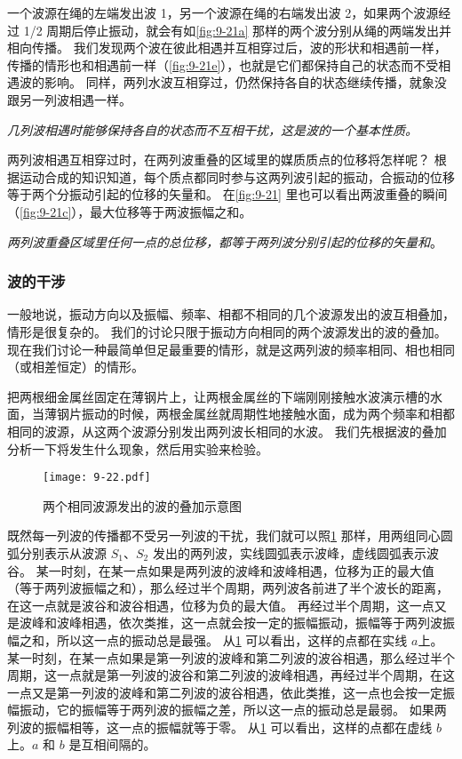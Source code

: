 一个波源在绳的左端发出波 1，另一个波源在绳的右端发出波 2，如果两个波源经过 1/2 周期后停止振动，就会有如\cref{fig:9-21a} 那样的两个波分别从绳的两端发出并相向传播。
我们发现两个波在彼此相遇并互相穿过后，波的形状和相遇前一样，传播的情形也和相遇前一样（\cref{fig:9-21e}），也就是它们都保持自己的状态而不受相遇波的影响。
同样，两列水波互相穿过，仍然保持各自的状态继续传播，就象没跟另一列波相遇一样。

\emph{几列波相遇时能够保持各自的状态而不互相干扰，这是波的一个基本性质。}

两列波相遇互相穿过时，在两列波重叠的区域里的媒质质点的位移将怎样呢？
根据运动合成的知识知道，每个质点都同时参与这两列波引起的振动，合振动的位移等于两个分振动引起的位移的矢量和。
在\cref{fig:9-21} 里也可以看出两波重叠的瞬间（\cref{fig:9-21c}），最大位移等于两波振幅之和。

\emph{两列波重叠区域里任何一点的总位移，都等于两列波分别引起的位移的矢量和}。

\subsubsection{波的干涉} 
一般地说，振动方向以及振幅、频率、相都不相同的几个波源发出的波互相叠加，情形是很复杂的。
我们的讨论只限于振动方向相同的两个波源发出的波的叠加。
现在我们讨论一种最简单但足最重要的情形，就是这两列波的频率相同、相也相同（或相差恒定）的情形。

把两根细金属丝固定在薄钢片上，让两根金属丝的下端刚刚接触水波演示槽的水面，当薄钢片振动的时候，两根金属丝就周期性地接触水面，成为两个频率和相都相同的波源，从这两个波源分别发出两列波长相同的水波。
我们先根据波的叠加分析一下将发生什么现象，然后用实验来检验。
\begin{figure}
  \texttt{[image: 9-22.pdf]}
  \caption{两个相同波源发出的波的叠加示意图}\label{fig:9-22}
\end{figure}

既然每一列波的传播都不受另一列波的干扰，我们就可以照\cref{fig:9-22} 那样，用两组同心圆弧分别表示从波源 $S_1$、$S_2$ 发出的两列波，实线圆弧表示波峰，虚线圆弧表示波谷。
某一时刻，在某一点如果是两列波的波峰和波峰相遇，位移为正的最大值（等于两列波振幅之和），那么经过半个周期，两列波各前进了半个波长的距离，在这一点就是波谷和波谷相遇，位移为负的最大值。
再经过半个周期，这一点又是波峰和波峰相遇，依次类推，这一点就会按一定的振幅振动，振幅等于两列波振幅之和，所以这一点的振动总是最强。
从\cref{fig:9-22} 可以看出，这样的点都在实线 $a$上。某一时刻，在某一点如果是第一列波的波峰和第二列波的波谷相遇，那么经过半个周期，这一点就是第一列波的波谷和第二列波的波峰相遇，再经过半个周期，在这一点又是第一列波的波峰和第二列波的波谷相遇，依此类推，这一点也会按一定振幅振动，它的振幅等于两列波的振幅之差，所以这一点的振动总是最弱。
如果两列波的振幅相等，这一点的振幅就等于零。
从\cref{fig:9-22} 可以看出，这样的点都在虚线 $b$ 上。$a$ 和 $b$ 是互相间隔的。

